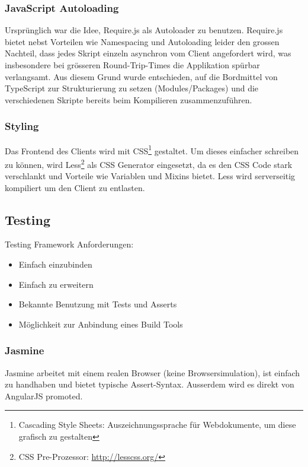 			
			\subsubsection{JavaScript Autoloading}
				Ursprünglich war die Idee, Require.js als Autoloader zu benutzen.
				Require.js bietet nebst Vorteilen wie Namespacing und Autoloading leider den grossen Nachteil,
				dass jedes Skript einzeln asynchron vom Client angefordert wird, 
				was insbesondere bei grösseren Round-Trip-Times die Applikation spürbar verlangsamt.
				Aus diesem Grund wurde entschieden, 
				auf die Bordmittel von TypeScript zur Strukturierung zu setzen (Modules/Packages) 
				und die verschiedenen Skripte bereits beim Kompilieren zusammenzuführen.
				

			\subsubsection{Styling}
				Das Frontend des Clients wird mit CSS\footnote{Cascading Style Sheets: Auszeichnungssprache für Webdokumente, um diese grafisch zu gestalten} gestaltet.
				Um dieses einfacher schreiben zu können,
				wird Less\footnote{CSS Pre-Prozessor: \url{http://lesscss.org/}} als CSS Generator eingesetzt, da es den CSS Code stark verschlankt und Vorteile wie Variablen und Mixins bietet.
				Less wird serverseitig kompiliert um den Client zu entlasten.
				
		\subsection{Testing}
			Testing Framework Anforderungen:
			\begin{itemize}
				\item Einfach einzubinden
				\item Einfach zu erweitern
				\item Bekannte Benutzung mit Tests und Asserts
				\item Möglichkeit zur Anbindung eines Build Tools
			\end{itemize}

			\subsubsection{Jasmine}
				Jasmine arbeitet mit einem realen Browser (keine Browsersimulation), 
				ist einfach zu handhaben und bietet typische Assert-Syntax.
				Ausserdem wird es direkt von AngularJS promoted.
				
				
